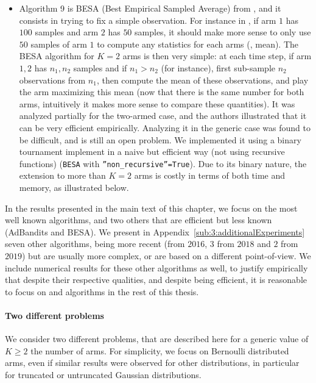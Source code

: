\begin{itemize}
    \item Algorithm 9 is
    BESA (Best Empirical Sampled Average) from \cite{Baransi2014}, and it consists in trying to fix a simple observation.
    For instance in \UCB, if arm $1$ has $100$ samples and arm $2$ has $50$ samples, it should make more sense to only use $50$ samples of arm $1$ to compute any statistics for each arms (\eg, mean).
    The BESA algorithm for $K=2$ arms is then very simple: at each time step, if arm $1,2$ has $n_1,n_2$ samples and if $n_1>n_2$ (for instance), first sub-sample $n_2$ observations from $n_1$, then compute the mean of these observations, and play the arm maximizing this mean (now that there is the same number for both arms, intuitively it makes more sense to compare these quantities).
    It was analyzed partially for the two-armed case, and the authors illustrated that it can be very efficient empirically.
    Analyzing it in the generic case was found to be difficult, and is still an open problem.
    We implemented it using a binary tournament implement in a naive but efficient way (not using recursive functions) (\texttt{BESA} with \texttt{''non\_recursive''=True}).
    Due to its binary nature, the extension to more than $K=2$ arms is costly in terms of both time and memory, as illustrated below.
\end{itemize}

In the results presented in the main text of this chapter, we focus on the most well known algorithms, and two others that are efficient but less known (AdBandits and BESA).
We present in Appendix~\ref{sub:3:additionalExperiments} seven other algorithms, being more recent (from $2016$, $3$ from $2018$ and $2$ from $2019$) but are usually more complex, or are based on a different point-of-view.
We include numerical results for these other algorithms as well, to justify empirically that despite their respective qualities, and despite being efficient, it is reasonable to focus on \UCB{} and \klUCB{} algorithms in the rest of this thesis.


\paragraph{Two different problems}

We consider two different problems, that are described here for a generic value of $K \geq 2$ the number of arms.
For simplicity, we focus on Bernoulli distributed arms, even if similar results were observed for other distributions, in particular for truncated or untruncated Gaussian distributions.

